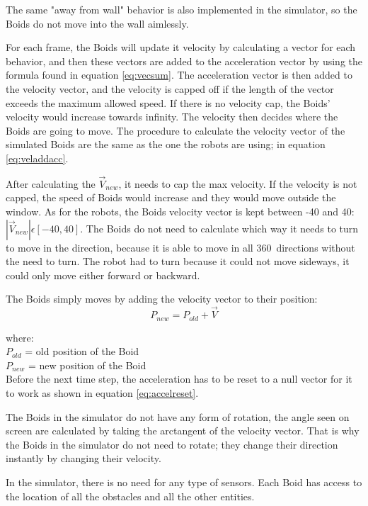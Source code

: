 The same "away from wall" behavior is also implemented in the simulator, so the Boids do not move into the wall aimlessly.

For each frame, the Boids will update it velocity by calculating a vector for each behavior, and then these vectors are added to the acceleration vector by using the formula found in equation \ref{eq:vecsum}. The acceleration vector is then added to the velocity vector, and the velocity is capped off if the length of the vector exceeds the maximum allowed speed. If there is no velocity cap, the Boids' velocity would increase towards infinity. The velocity then decides where the Boids are going to move.
The procedure to calculate the velocity vector of the simulated Boids are the same as the one the robots are using; in equation \ref{eq:veladdacc}. 

After calculating the $\vec{V}_{new}$, it needs to cap the max velocity. If the velocity is not capped, the speed of Boids would increase and they would move outside the window. As for the robots, the Boids velocity vector is kept between -40 and 40:  $|\vec{V}_{new}| \epsilon [-40,40]$.
The Boids do not need to calculate which way it needs to turn to move in the direction, because it is able to move in all 360\textdegree\ directions without the need to turn. The robot had to turn because it could not move sideways, it could only move either forward or backward.

The Boids simply moves by adding the velocity vector to their position:
\begin{equation}
\label{eq:posadd}
P_{new} = P_{old} + \vec{V}
\end{equation}

where:\\
$P_{old}$ = old position of the Boid\\
$P_{new}$ = new position of the Boid\\

Before the next time step, the acceleration has to be reset to a null vector for it to work as shown in equation \ref{eq:accelreset}.

The Boids in the simulator do not have any form of rotation, the angle seen on screen are calculated by taking the arctangent of the velocity vector. That is why the Boids in the simulator do not need to rotate; they change their direction instantly by changing their velocity.

In the simulator, there is no need for any type of sensors. Each Boid has access to the location of all the obstacles and all the other entities.

